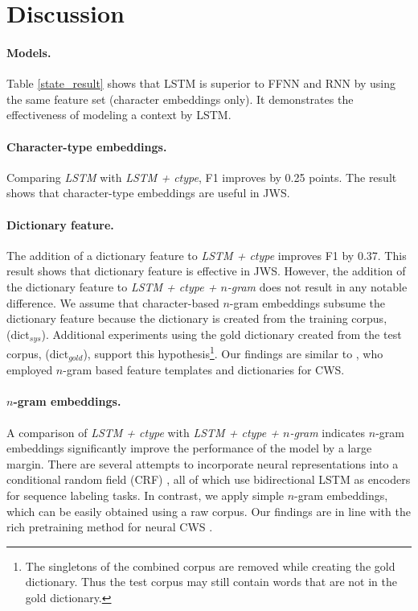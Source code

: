 \documentclass[11pt]{article}
\begin{document}
\section{Discussion}
\paragraph{Models.}
Table \ref{state_result} shows that LSTM is superior to FFNN and RNN by using
the same feature set (character embeddings only). It demonstrates the
effectiveness of modeling a context by LSTM.

\paragraph{Character-type embeddings.} Comparing {\it LSTM} with {\it LSTM +
ctype}, F1 improves by 0.25 points. The result shows that character-type
embeddings are useful in JWS.

\paragraph{Dictionary feature.} The addition of a dictionary feature to {\it
LSTM + ctype} improves F1 by 0.37. This result shows that dictionary feature
is effective in JWS. However, the addition of the dictionary feature to {\it
LSTM + ctype + $n$-gram} does not result in any notable difference. We
assume that character-based $n$-gram embeddings subsume the dictionary
feature because the dictionary is created from the training corpus,
(dict$_{\mathit{sys}}$). 
Additional experiments using the gold dictionary created from the test corpus,
(dict$_{\mathit{gold}}$), support this hypothesis\footnote{The singletons of
the combined corpus are removed while creating the gold dictionary. Thus the
test corpus may still contain words that are not in the gold dictionary.}.
Our findings are similar to , who
employed $n$-gram based feature templates and dictionaries for CWS.

\paragraph{$n$-gram embeddings.} A comparison of {\it LSTM + ctype} with {\it
LSTM + ctype + $n$-gram} indicates $n$-gram embeddings significantly improve
the performance of the model by a large margin. 
There are several attempts to incorporate neural representations into
a conditional random field (CRF) \cite{ma-hovy:2016:ACL2016,lemple-EtAl:2016:NAACL2016,peters-EtAl:2017:ACL2017},
all of which use bidirectional LSTM as encoders for sequence labeling tasks.
In contrast, we apply simple $n$-gram embeddings, which can be
easily obtained using a raw corpus. Our findings are in line with the rich
pretraining method for neural CWS \cite{yang-EtAl:2017:ACL2017}.
\end{document}
